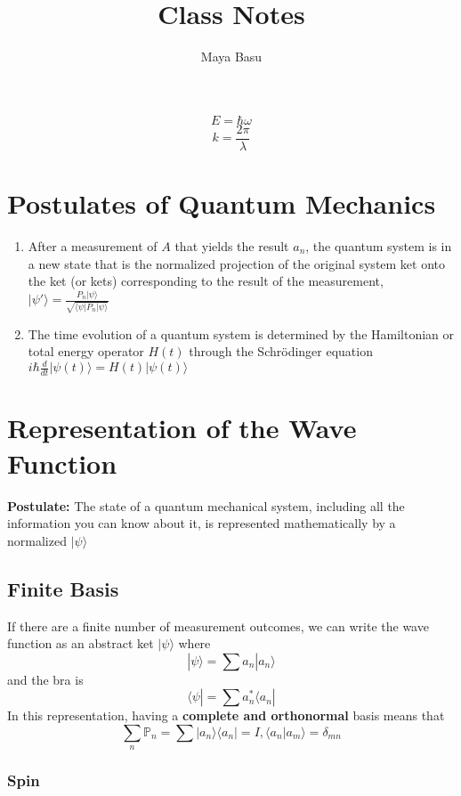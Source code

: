 \documentclass{homework}
\author{Maya Basu}
\title{Class Notes}
\newcommand{\PP}{\mathbb{P}}
\newcommand{\kt}{\rangle}
\newcommand{\br}{\langle}
\newcommand{\ket}[1]{| #1 \rangle}
\newcommand{\bra}[1]{ \langle #1 |}
\begin{document}
 

\maketitle

\[E = \hbar \omega\]
\[k = \frac{2\pi}{\lambda}\]

\section{Postulates of Quantum Mechanics}
\begin{enumerate}

    \item After a measurement of $A$ that yields the result $a_n$, the quantum system is in a new state that is the normalized projection of the original system ket onto the ket (or kets) corresponding to the result of the measurement, $| \psi' \kt = \frac{P_n | \psi \kt}{\sqrt{ \br \psi | P_n | \psi \kt}}$
    
    \item The time evolution of a quantum system is determined by the Hamiltonian or total energy operator $H(t)$ through the Schrödinger equation $i\hbar \frac{d}{dt}| \psi (t) \kt = H(t)| \psi (t) \kt$

\end{enumerate}




\section{Representation of the Wave Function}

\textbf{Postulate: }The state of a quantum mechanical system, including all the information you can know about it, is represented mathematically by a normalized $| \psi \kt$ 

\subsection{Finite Basis}

If there are a finite number of measurement outcomes, we can write the wave function as an abstract ket $\ket{\psi}$ where $$\ket{\psi} = \sum a_n\ket{a_n}$$
and the bra is $$\bra{\psi} = \sum a_n^*\bra{a_n}$$
In this representation, having a \textbf{complete and orthonormal} basis means that 
\[\sum_n \PP_n = \sum \ket{a_n}\bra{a_n} = I, \bra{a_n}a_m \rangle  = \delta_{mn}\]


\subsubsection{Spin}
\end{document}
